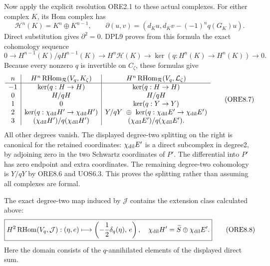 Now apply the explicit resolution ORE2.1 to these actual complexes. For
either complex \(K\), its Hom complex has \[
\mathscr H^n(K)=K^n\oplus K^{n-1},\qquad
\partial(u,v)=(d_Ku,d_Kv-(-1)^nq(G_K)u).
\tag{ORE8.5}
\] Direct substitution gives \(\partial^2=0\). DPL9 proves from this
formula the exact cohomology sequence \[
0\to H^{n-1}(K)/qH^{n-1}(K)
\to H^n\mathscr H(K)\to\ker(q:H^n(K)\to H^n(K))\to0.
\tag{ORE8.6}
\] Because every nonzero \(q\) is invertible on \(C_\zeta\), these
formulas give \[
\begin{array}{c|c|c}
n&H^n\operatorname{RHom}_{\mathcal R}(V_q,K_\zeta)&
H^n\operatorname{RHom}_{\mathcal R}(V_q,\mathcal L_\zeta)\\ \hline
-1&\ker(q:H\to H)&\ker(q:H\to H)\\
0&H/qH&H/qH\\
1&0&\ker(q:Y\to Y)\\
2&\ker(q:\chi_{\rm dil}H'\to\chi_{\rm dil}H')&
Y/qY\ \oplus\ \ker(q:\chi_{\rm dil}E'\to\chi_{\rm dil}E')\\
3&(\chi_{\rm dil}H')/q(\chi_{\rm dil}H')&
(\chi_{\rm dil}E')/q(\chi_{\rm dil}E').
\end{array}
\tag{ORE8.7}
\] All other degrees vanish. The displayed degree-two splitting on the
right is canonical for the retained coordinates: \(\chi_{\rm dil}E'\) is
a direct subcomplex in degree2, by adjoining zero in the two Schwartz
coordinates of \(P'\). The differential into \(P'\) has zero endpoint
and extra coordinates. The remaining degree-two cohomology is \(Y/qY\)
by ORE8.6 and UOS6.3. This proves the splitting rather than assuming all
complexes are formal.

The exact degree-two map induced by \(\mathcal J\) contains the
extension class calculated above: \[
\boxed{
H^2\operatorname{RHom}(V_q,\mathcal J):
(\eta,e)\longmapsto
\left(-\frac12\delta_q(\eta),\,e\right),
\quad
\chi_{\rm dil}H'=\widetilde S\oplus\chi_{\rm dil}E'.}
\tag{ORE8.8}
\] Here the domain consists of the \(q\)-annihilated elements of the
displayed direct sum.

